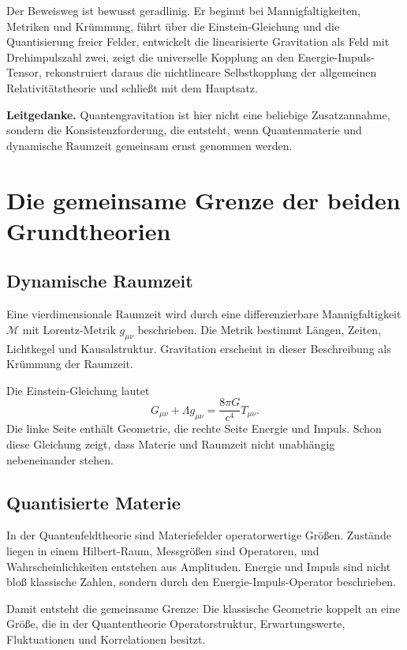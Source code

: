 \documentclass[11pt,a4paper,openany]{book}
\theoremstyle{remark}
\newcommand{\M}{\mathcal{M}}
\begin{document}
Der Beweisweg ist bewusst geradlinig. Er beginnt bei Mannigfaltigkeiten, Metriken und Krümmung, führt über die Einstein-Gleichung und die Quantisierung freier Felder, entwickelt die linearisierte Gravitation als Feld mit Drehimpulszahl zwei, zeigt die universelle Kopplung an den Energie-Impuls-Tensor, rekonstruiert daraus die nichtlineare Selbstkopplung der allgemeinen Relativitätstheorie und schließt mit dem Hauptsatz.

\begin{merkkasten}
\textbf{Leitgedanke.} Quantengravitation ist hier nicht eine beliebige Zusatzannahme, sondern die Konsistenzforderung, die entsteht, wenn Quantenmaterie und dynamische Raumzeit gemeinsam ernst genommen werden.
\end{merkkasten}

\chapter{Die gemeinsame Grenze der beiden Grundtheorien}
\section{Dynamische Raumzeit}
Eine vierdimensionale Raumzeit wird durch eine differenzierbare Mannigfaltigkeit $\M$ mit Lorentz-Metrik $g_{\mu\nu}$ beschrieben. Die Metrik bestimmt Längen, Zeiten, Lichtkegel und Kausalstruktur. Gravitation erscheint in dieser Beschreibung als Krümmung der Raumzeit.

Die Einstein-Gleichung lautet
\begin{equation}
G_{\mu\nu}+\Lambda g_{\mu\nu}=\frac{8\pi G}{c^4}T_{\mu\nu}.
\end{equation}
Die linke Seite enthält Geometrie, die rechte Seite Energie und Impuls. Schon diese Gleichung zeigt, dass Materie und Raumzeit nicht unabhängig nebeneinander stehen.

\section{Quantisierte Materie}
In der Quantenfeldtheorie sind Materiefelder operatorwertige Größen. Zustände liegen in einem Hilbert-Raum, Messgrößen sind Operatoren, und Wahrscheinlichkeiten entstehen aus Amplituden. Energie und Impuls sind nicht bloß klassische Zahlen, sondern durch den Energie-Impuls-Operator beschrieben.

Damit entsteht die gemeinsame Grenze: Die klassische Geometrie koppelt an eine Größe, die in der Quantentheorie Operatorstruktur, Erwartungswerte, Fluktuationen und Korrelationen besitzt.
\end{document}
